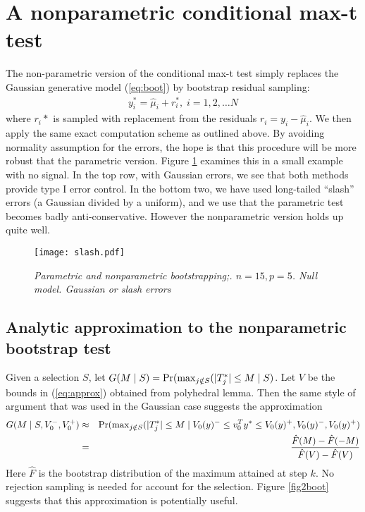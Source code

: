 \documentclass{article}
\begin{document}
{{\section{A nonparametric conditional max-t test }
\label{sec:bootstrap}
The non-parametric version of the conditional max-t test simply replaces the Gaussian generative model (\ref{eq:boot}) by bootstrap residual sampling:
\begin{eqnarray}
y_i^*=\hat\mu_i+ r_i^*,\; i=1,2,\ldots N
\label{eq:bootnp}
\end{eqnarray}
where $r_i*$ is sampled with replacement from the residuals $r_i=y_i-\hat\mu_i$.
We then apply the same exact computation scheme as outlined above.
By avoiding normality assumption for the errors,  the hope is that this procedure will be more robust that the parametric version.
Figure \ref{fig:slash} examines this in a small example with no signal.
In the top row, with Gaussian errors, we see that both methods provide type I error control.
In the bottom two, we have used long-tailed ``slash'' errors (a Gaussian divided by a uniform), and we use that the parametric  test becomes
badly anti-conservative.  However the nonparametric version holds up quite well.
\begin{figure}[hbtp]
\centering
\texttt{[image: slash.pdf]}  
\caption{\em Parametric and nonparametric bootstrapping;. $n= 15, p=5$. Null model.
Gaussian or slash errors}
\label{fig:slash}
\end{figure}

\subsection{Analytic approximation to the nonparametric bootstrap test}
Given a selection $S$, let $G(M \mid S)=\Pr({\rm max}_{j \notin S} (|T^*_j|\leq M \mid S)$.
Let $V$ be the bounds  in (\ref{eq:approx}) obtained from polyhedral lemma.
Then the same style of  argument that  was used in the Gaussian case suggests the approximation
\begin{eqnarray}
G(M \mid S, V_0^- ,V_0^+) &\approx& \Pr({\rm max}_{j \notin S} (|T^*_j|\leq M\mid V_0(y)^- \leq v_0^Ty^*\leq V_0(y)^+,V_0(y)^- ,V_0(y)^+)\cr
&=& \frac{ {\hat F}(M)-{\hat F}(-M)} {  {\hat F}(V)-{\hat F}(V)}
\label{eq:bootapprox}
\end{eqnarray}
Here $\hat F$ is the bootstrap distribution of the maximum attained  at step $k$. No rejection sampling is needed for account for the selection.
Figure \ref{fig2boot} suggests that this approximation is potentially useful.


}}
\end{document}
